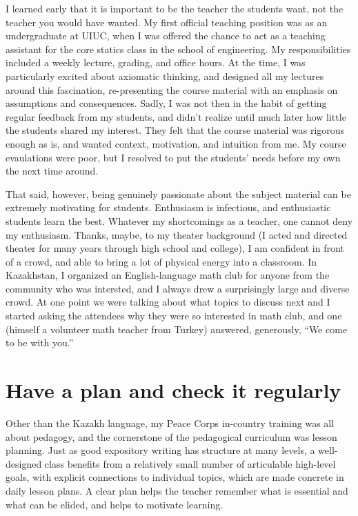\documentclass{article}
\begin{document}
I learned early that it is important to be the teacher the students want, not
the teacher you would have wanted.  My first official teaching position was as
an undergraduate at UIUC, when I was offered the chance to act as a teaching
assistant for the core statics class in the school of engineering. My
responsibilities included a weekly lecture, grading, and office hours. At the
time, I was particularly excited about axiomatic thinking, and designed all my
lectures around this fascination, re-presenting the course material with an
emphasis on assumptions and consequences.  Sadly, I was not then in the habit of
getting regular feedback from my students, and didn't realize until much later
how little the students shared my interest.  They felt that the course material
was rigorous enough as is, and wanted context, motivation, and intuition from
me.  My course evaulations were poor, but I resolved to put the students'
needs before my own the next time around.

That said, however, being genuinely passionate about the subject material can be
extremely motivating for students.  Enthusiasm is infectious, and enthusiastic
students learn the best.  Whatever my shortcomings as a teacher, one cannot deny
my enthusiasm.  Thanks, maybe, to my theater background (I acted and directed
theater for many years through high school and college), I am confident in front
of a crowd, and able to bring a lot of physical energy into a classroom.  In
Kazakhstan, I organized an English-language math club for anyone from the
community who was intersted, and I always drew a surprisingly large and diverse
crowd.  At one point we were talking about what topics to discuss next and
I started asking the attendees why they were so interested in math club, and
one (himself a volunteer math teacher from Turkey) answered, generously,
``We come to be with you.''


\section{Have a plan and check it regularly}

Other than the Kazakh language, my Peace Corps in-country training was all about
pedagogy, and the cornerstone of the pedagogical curriculum was lesson planning.
Just as good expository writing has structure at many levels, a well-designed
class benefits from a relatively small number of articulable high-level goals,
with explicit connections to individual topics, which are made concrete in daily
lesson plans.  A clear plan helps the teacher remember what is essential and
what can be elided, and helps to motivate learning.
\end{document}
